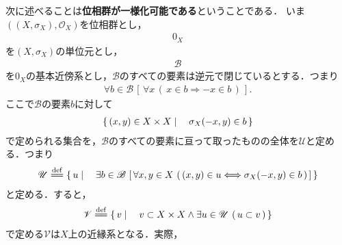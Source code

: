 	次に述べることは{\bf 位相群が一様化可能である}ということである．
	いま$\left(\left(X,\sigma_X\right),\mathscr{O}_X\right)$を位相群とし，
	\begin{align}
		0_X
	\end{align}
	を$\left(X,\sigma_X\right)$の単位元とし，
	\begin{align}
		\mathscr{B}
	\end{align}
	を$0_X$の基本近傍系とし，$\mathscr{B}$のすべての要素は逆元で閉じているとする．つまり
	\begin{align}
		\forall b \in \mathscr{B}\, \left[\, \forall x\, (\, x \in b \Longrightarrow -x \in b\, )\, \right].
	\end{align}
	ここで$\mathscr{B}$の要素$b$に対して
	\begin{align}
		\left\{\, (x,y) \in X \times X \mid \quad \sigma_X(-x,y) \in b\, \right\}
	\end{align}
	で定められる集合を，$\mathscr{B}$のすべての要素に亘って取ったものの全体を$\mathscr{U}$と定める．つまり
	\begin{align}
		\mathscr{U} \defeq \Set{u}{\exists b \in \mathscr{B}\,
		\left[\, \forall x,y \in X\, \left(\, (x,y) \in u \Longleftrightarrow\sigma_X(-x,y) \in b\, \right)\, \right]}
	\end{align}
	と定める．すると，
	\begin{align}
		\mathscr{V} \defeq \Set{v}{v \subset X \times X \wedge \exists u \in \mathscr{U}\, \left(\, u \subset v\, \right)}
	\end{align}
	で定める$\mathscr{V}$は$X$上の近縁系となる．実際，
